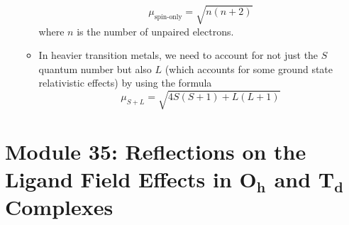 \documentclass[../notes.tex]{subfiles}
\begin{document}
\begin{itemize}
\begin{itemize}
        \begin{equation*}
            \mu_\text{spin-only} = \sqrt{n(n+2)}
        \end{equation*}
        where $n$ is the number of unpaired electrons.
        \item In heavier transition metals, we need to account for not just the $S$ quantum number but also $L$ (which accounts for some ground state relativistic effects) by using the formula
        \begin{equation*}
            \mu_{S+L} = \sqrt{4S(S+1)+L(L+1)}
        \end{equation*}
    \end{itemize}
\end{itemize}



\section[Module 35: Reflections on the Ligand Field Effects in \texorpdfstring{$O_h$}{TEXT} and \texorpdfstring{$T_d$}{TEXT} Complexes]{Module 35: Reflections on the Ligand Field Effects in \texorpdfstring{$\bm{O_h}$}{TEXT} and \texorpdfstring{$\bm{T_d}$}{TEXT} Complexes}
\end{document}
